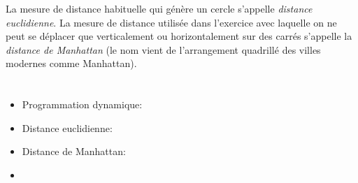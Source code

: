 {{La mesure de distance habituelle qui génère un cercle s’appelle \emph{distance euclidienne}. La mesure de distance utilisée dans l’exercice avec laquelle on ne peut se déplacer que verticalement ou horizontalement sur des carrés s’appelle la \emph{distance de Manhattan} (le nom vient de l’arrangement quadrillé des villes modernes comme Manhattan).



\section*{\BrochureWebsitesAndKeywords}
{\raggedright
\begin{itemize}
  \item Programmation dynamique: \href{https://fr.wikipedia.org/wiki/Programmation_dynamique}{}
  \item Distance euclidienne: \href{https://fr.wikipedia.org/wiki/Distance_(math\%C3\%A9matiques)}{}
  \item Distance de Manhattan: \href{https://fr.wikipedia.org/wiki/Distance_de_Manhattan}{}
  \item \href{https://fr.wikipedia.org/wiki/Espace_euclidien}{}
\end{itemize}


}

}{}

\def\AuthorTomcsanyiovaM{} %
\def\AuthorIorgulescuT{} %
\def\AuthorTomcsanyiP{} %
\def\AuthorJungU{} %
\def\AuthorMoonK{} %
\def\AuthorRossmanithP{} %
\def\AuthorFreiF{} %
\def\AuthorDatzkoC{} %
\def\AuthorDatzkoS{} %
\def\AuthorPelletE{} %

\newpage}{}
